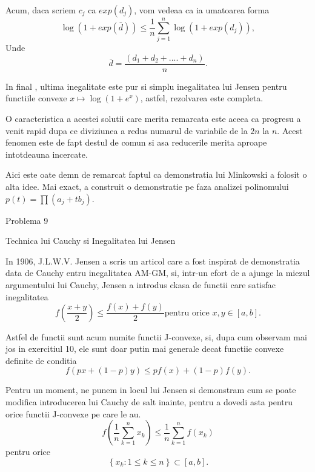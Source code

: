 \documentclass[a4paper,12pt,oneside]{report}
\begin{document}
Acum, daca scriem \(c_{j}\) ca \(exp\left (d _{j} \right )\), vom vedeaa ca ia umatoarea forma 
\begin{displaymath}
  \log\left ( 1 + exp\left ( \bar{d} \right ) \right ) \leq \frac{1}{n}\sum_{j = 1}^{n}\log\left ( 1 + exp\left ( d_{j} \right ) \right ),
\end{displaymath}
Unde 
\begin{displaymath}
  \bar{d} = \frac{\left ( d_{1} + d_{2}  + ....+ d_{n}\right )}{n}.
\end{displaymath} 

In final , ultima inegalitate este pur si simplu inegalitatea lui Jensen pentru functiile convexe \(x \mapsto \log \left ( 1 + e^{x} \right )\), astfel, rezolvarea este completa. 

O caracteristica a acestei solutii care merita remarcata este aceea ca progresu a venit rapid dupa ce diviziunea a redus numarul de variabile de la \(2n\) la \(n\). Acest fenomen este de fapt destul de comun si asa reducerile merita aproape intotdeauna incercate. 

Aici este oate demn de remarcat faptul ca demonstratia lui Minkowski a folosit o alta idee. Mai exact, a construit o demonstratie pe faza analizei polinomului \(p\left ( t \right ) = \prod \left ( a_{j}  + tb_{j}\right )\).

Problema 9 

Technica lui Cauchy si Inegalitatea lui Jensen

In 1906, J.L.W.V. Jensen a scris un articol care a fost inspirat de demonstratia data de Cauchy entru inegalitatea AM-GM, si, intr-un efort de a ajunge la miezul argumentului lui Cauchy, Jensen a introdus ckasa de functii care satisfac inegalitatea 
\begin{displaymath}
  f\left ( \frac{x + y}{2} \right ) \leq \frac{f\left ( x \right ) + f\left ( y \right )}{2} \text{pentru orice } x,y \in \left [ a, b \right ]. \label{eq:2.14} \tag{2.14}
\end{displaymath}

Astfel de functii sunt acum numite functii J-convexe, si, dupa cum observam mai jos in exercitiul 10, ele sunt doar putin mai generale decat functiie convexe definite de conditia
\begin{displaymath}
  f\left ( px + \left ( 1 - p \right )y \right )\leq pf\left ( x \right ) + \left ( 1-p \right )f\left ( y \right ). 
\end{displaymath} 

Pentru un moment, ne punem in locul lui Jensen si demonstram cum se poate modifica introducerea lui Cauchy de salt inainte, pentru a dovedi asta pentru orice functii  J-convexe pe care le au. 
\begin{displaymath}
  f\left ( \frac{1}{n} \sum_{k = 1}^{n}x_{k}\right )\leq \frac{1}{n}\sum_{k = 1}^{n}f\left ( x_{k} \right )
\end{displaymath}
pentru orice 
\begin{displaymath}
  \left \{ x_{k}: 1\leq k \leq n \right \} \subset \left [ a, b \right ]. \label{eq:2.15} \tag{2.15}
\end{displaymath}
\end{document}
